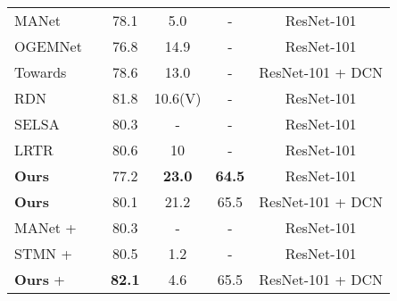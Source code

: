 \documentclass[runningheads]{llncs}
\newcommand{\cmark}{\ding{51}}\newcommand{\xmark}{\ding{55}}
\begin{document}
\begin{table}[t]
\begin{tabular}{lccccc}
MANet\cite{wang2018fully}                                          &     \xmark  & 78.1             & 5.0                &-      & ResNet-101           \\
OGEMNet\cite{deng2019object}                                      &     \cmark & 76.8         & 14.9               &-       & ResNet-101            \\
Towards \cite{zhu2018towards}                  &     \cmark  & 78.6             & 13.0               &-       & ResNet-101 + DCN      \\
RDN  \cite{deng2019relation}              &     \xmark   & 81.8      &  10.6(V)                &-     & ResNet-101          \\
SELSA \cite{wu2019sequence}           &     \xmark   & 80.3      & -                &-      & ResNet-101            \\
LRTR \cite{shvets2019leveraging}             &     \xmark   & 80.6      & 10                &-    & ResNet-101            \\
\textbf{Ours}                                                        &   \cmark    & 77.2    & \textbf{23.0}             & \textbf{64.5}& ResNet-101   \\
\textbf{Ours}                                                     &   \cmark    & 80.1    & 21.2               & 65.5  & ResNet-101 + DCN  \\
\bottomrule[0.8pt]
MANet\cite{wang2018fully} + \cite{han2016seq}               &     \xmark     & 80.3             & -                  &-       & ResNet-101          \\
STMN \cite{xiao2018video} + \cite{han2016seq}            &     \xmark   & 80.5             & 1.2                &-       & ResNet-101            \\
\textbf{Ours} +\cite{han2016seq}                     &   \cmark   & \textbf{82.1}    & 4.6               & 65.5    & ResNet-101 + DCN    \\
\bottomrule
\end{tabular}
\label{table:video object detection results}
\end{table}
\end{document}
